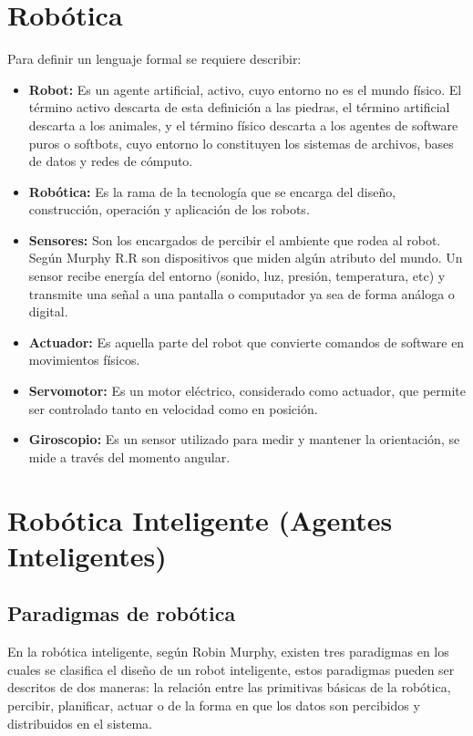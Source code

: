 \section{Robótica} \label{sect:robotica}
 
Para definir un lenguaje formal se requiere describir:
\begin{itemize}
\item{\textbf{Robot:} Es un agente artificial, activo, cuyo entorno no es el mundo físico. El término activo descarta de esta definición a las piedras, el término artificial descarta a los animales, y el término físico descarta a los agentes de software puros o softbots, cuyo entorno lo constituyen los sistemas de archivos, bases de datos y redes de cómputo. \cite{peterNorvig}}

\item{\textbf{Robótica:} Es la rama de la tecnología que se encarga del diseño, construcción, operación y aplicación de los robots. \cite{oxfordRobotics}}

\item{\textbf{Sensores:}  Son los encargados de percibir el ambiente que rodea al robot. Según Murphy R.R son dispositivos que miden algún atributo del mundo. Un sensor recibe energía del entorno (sonido, luz, presión, temperatura, etc) y transmite una señal a una pantalla o computador ya sea de forma análoga o digital. \cite{AiRobotics}}

\item{\textbf{Actuador:}  Es aquella parte del robot que convierte comandos de software en movimientos físicos.  \cite{peterNorvig}}

\item{\textbf{Servomotor:}  Es un motor eléctrico, considerado como actuador, que permite ser controlado tanto en velocidad como en posición. }

\item{\textbf{Giroscopio:} Es un sensor utilizado para medir y mantener la orientación, se mide a través del momento angular. \cite{gyro1}}
\end{itemize}

\section{Robótica Inteligente (Agentes Inteligentes)} \label{sect:AgentesInteligentes}
\subsection{Paradigmas de robótica}
En la robótica inteligente, según Robin Murphy, existen tres paradigmas en los cuales se clasifica el diseño de un robot inteligente, estos paradigmas pueden ser descritos de dos maneras: la relación entre las primitivas básicas de la robótica, percibir, planificar, actuar o de la forma en que los datos son percibidos y distribuidos en el sistema.

